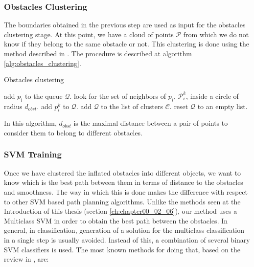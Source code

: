 \subsubsection{Obstacles Clustering}\label{ch:chapter06_01_01_02}

The boundaries obtained in the previous step are used as input for the obstacles clustering stage. At this point, we have a cloud of points $\mathcal{P}$ from which we do not know if they belong to the same obstacle or not. This clustering is done using the method described in \cite{rusu2009semantic}. The procedure is described at algorithm \ref{alg:obstacles_clustering}.

\begin{algorithm}[h!]
\caption{Obstacles clustering}
\label{alg:obstacles_clustering}
\begin{algorithmic}
  \State add $p_i$ to the queue $\mathcal{Q}$.
    \State look for the set of neighbors of $p_i$, $\mathcal{P}_i^k$, inside a circle of radius $d_{obst}$.
	\State add $p_i^k$ to $\mathcal{Q}$.
      \EndIf
    \EndFor
      \State add $\mathcal{Q}$ to the list of clusters $\mathcal{C}$.
      \State reset $\mathcal{Q}$ to an empty list.
    \EndIf
  \EndFor
\EndFor
\end{algorithmic}
\end{algorithm}

In this algorithm, $d_{obst}$ is the maximal distance between a pair of points to consider them to belong to different obstacles.

\subsubsection{\ac{SVM} Training}\label{ch:chapter06_01_01_03}

Once we have clustered the inflated obstacles into different objects, we want to know which is the best path between them in terms of distance to the obstacles and smoothness. The way in which this is done makes the difference with respect to other \ac{SVM} based path planning algorithms. Unlike the methods seen at the Introduction of this thesis (section \ref{ch:chapter00_02_06}), our method uses a Multiclass \acs{SVM} in order to obtain the best path between the obstacles. In general, in classification, generation of a solution for the multiclass classification in a single step is usually avoided. Instead of this, a combination of several binary \ac{SVM} classifiers is used. The most known methods for doing that, based on the review in \cite{hsu2002comparison, duan2005best}, are:

